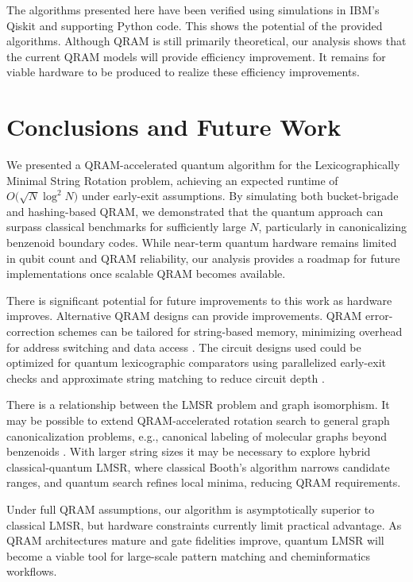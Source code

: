 \documentclass[11pt,letterpaper]{article}
\begin{document}
The algorithms presented here have been verified using simulations in IBM's Qiskit \cite{qiskit2024} and supporting Python code. This shows the potential of the provided algorithms. Although QRAM is still primarily theoretical, our analysis shows that the current QRAM models will provide efficiency improvement. It remains for viable hardware to be produced to realize these efficiency improvements.


\section{Conclusions and Future Work}
\label{sec:conclusion}
We presented a QRAM-accelerated quantum algorithm for the Lexicographically Minimal String Rotation problem, achieving an expected runtime of \(O\bigl(\sqrt{N}\log^2 N\bigr)\) under early-exit assumptions. By simulating both bucket-brigade and hashing-based QRAM, we demonstrated that the quantum approach can surpass classical benchmarks for sufficiently large \(N\), particularly in canonicalizing benzenoid boundary codes. While near-term quantum hardware remains limited in qubit count and QRAM reliability, our analysis provides a roadmap for future implementations once scalable QRAM becomes available.

There is significant potential for future improvements to this work as hardware improves. Alternative QRAM designs can provide improvements. QRAM error-correction schemes can be tailored for string-based memory, minimizing overhead for address switching and data access \cite{giovannetti2008architectures,hann2021resilience}. The circuit designs used could be optimized for quantum lexicographic comparators using parallelized early-exit checks and approximate string matching to reduce circuit depth \cite{oliveira2007quantum}.

There is a relationship between the LMSR problem and graph isomorphism. It may be possible to extend QRAM-accelerated rotation search to general graph canonicalization problems, e.g., canonical labeling of molecular graphs beyond benzenoids \cite{douglas2008classical}. With larger string sizes it may be necessary to explore hybrid classical-quantum LMSR, where classical Booth's algorithm narrows candidate ranges, and quantum search refines local minima, reducing QRAM requirements.

Under full QRAM assumptions, our algorithm is asymptotically superior to classical LMSR, but hardware constraints currently limit practical advantage. As QRAM architectures mature and gate fidelities improve, quantum LMSR will become a viable tool for large-scale pattern matching and cheminformatics workflows.
\end{document}
